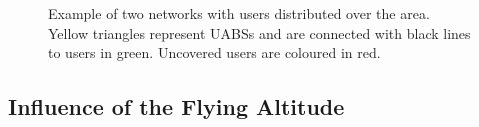 \begin{figure}[!htb]
\hfill
{}
\caption{Example of two networks with users distributed over the area. Yellow triangles represent \acs{UABS}s and are connected 
with black lines to users in green. Uncovered users are coloured in red.}
  \label{radpattern2}
\end{figure}

\subsection{Influence of the Flying Altitude}
\label{S3A}

